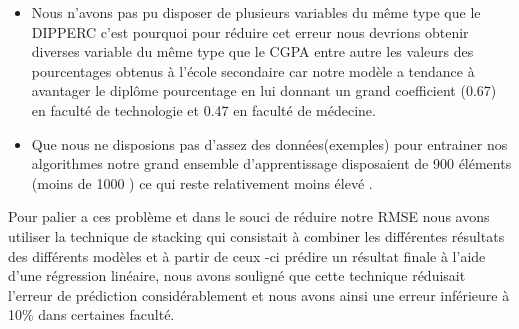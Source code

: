 \begin{itemize}
	\item Nous n'avons pas pu disposer de plusieurs variables du même type que le DIPPERC  c'est pourquoi pour réduire cet erreur nous devrions obtenir diverses variable du même type que le CGPA entre autre les valeurs des pourcentages obtenus à l'école secondaire car notre modèle a tendance à avantager le diplôme pourcentage en lui donnant un grand coefficient (0.67) en faculté de technologie et 0.47 en faculté de médecine. 
	\item Que nous ne disposions pas d'assez des données(exemples) pour entrainer nos algorithmes notre grand ensemble d'apprentissage disposaient de 900 éléments (moins de 1000 ) ce qui reste relativement  moins élevé   .
\end{itemize}

Pour palier a ces problème et dans le souci de réduire notre \ac{RMSE} nous avons utiliser la technique de stacking qui consistait à combiner les différentes résultats des différents modèles et à partir de ceux -ci prédire un résultat finale à l'aide d'une régression linéaire, nous avons souligné que cette technique réduisait l'erreur de prédiction considérablement et nous avons ainsi une erreur inférieure à 10\% dans certaines faculté.

